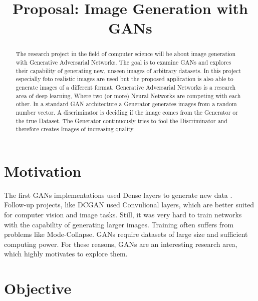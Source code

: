 \documentclass[conference,onecolumn,compsoc]{IEEEtran}
\begin{document}
\title{Proposal: Image Generation with GANs}

\author{
}
\maketitle

\begin{abstract}

\noindent
The research project in the field of computer science will be about image generation with Generative Adversarial Networks. The goal is to examine GANs and explores their capability of generating new, unseen images of arbitrary datasets. In this project especially foto realistic images are used but the proposed application is also able to generate images of a different format. Generative Adversarial Networks is a research area of deep learning, Where two (or more) Neural Networks are competing with each other. In a standard GAN architecture a Generator generates images from a random number vector. A discriminator is deciding if the image comes from the Generator or the true Dataset. The Generator continuously tries to fool the Discriminator and therefore creates Images of increasing quality.

\end{abstract}


\section{Motivation}

\noindent
The first GANs implementations used Dense layers to generate new data \cite{goodfellow2014generative}. Follow-up projects, like DCGAN \cite{radford2016unsupervised} used Convulional layers, which are better suited for computer vision and image tasks. Still, it was very hard to train networks with the capability of generating larger images. Training often suffers from problems like Mode-Collapse. GANs require datasets of large size and sufficient computing power. For these reasons, GANs are an interesting research area, which highly motivates to explore them.

\section{Objective}
\end{document}
